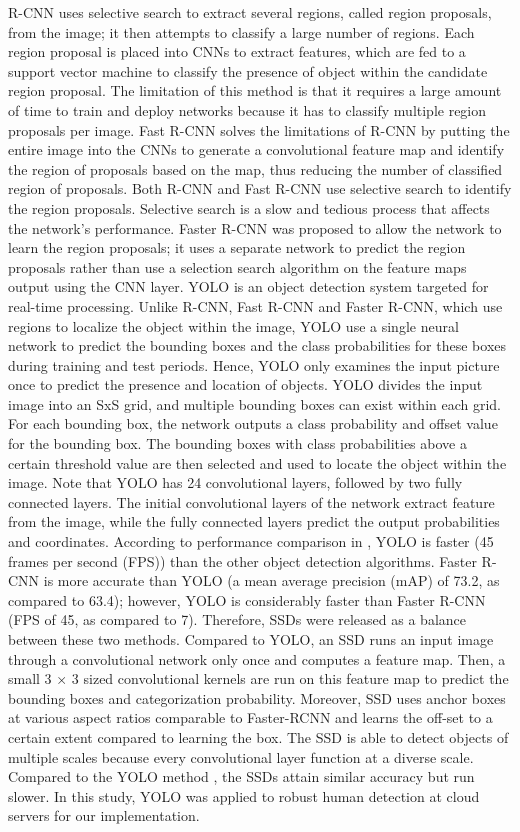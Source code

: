 R-CNN \cite{girshick2014rich} uses selective search \cite{uijlings2013selective} to extract several regions, called region proposals, from the image; it then attempts to classify a large number of regions. Each region proposal is placed into CNNs to extract features, which are fed to a support vector machine to classify the presence of object within the candidate region proposal. The limitation of this method is that it requires a large amount of time to train and deploy networks because it has to classify multiple region proposals per image. Fast R-CNN \cite{girshick2015fast} solves the limitations of R-CNN by putting the entire image into the CNNs to generate a convolutional feature map and identify the region of proposals based on the map, thus reducing the number of classified region of proposals. Both R-CNN and Fast R-CNN use selective search to identify the region proposals. Selective search is a slow and tedious process that affects the network’s performance. Faster R-CNN \cite{ren2015faster} was proposed to allow the network to learn the region proposals; it uses a separate network to predict the region proposals rather than use a selection search algorithm on the feature maps output using the CNN layer. YOLO \cite{redmon2016you} is an object detection system targeted for real-time processing. Unlike R-CNN, Fast R-CNN and Faster R-CNN, which use regions to localize the object within the image, YOLO use a single neural network to predict the bounding boxes and the class probabilities for these boxes during training and test periods. Hence, YOLO only examines the input picture once to predict the presence and location of objects. YOLO divides the input image into an SxS grid, and multiple bounding boxes can exist within each grid. For each bounding box, the network outputs a class probability and offset value for the bounding box. The bounding boxes with class probabilities above a certain threshold value are then selected and used to locate the object within the image. Note that YOLO has 24 convolutional layers, followed by two fully connected layers. The initial convolutional layers of the network extract feature from the image, while the fully connected layers predict the output probabilities and coordinates. According to performance comparison in \cite{redmon2018yolov3}, YOLO is faster (45 frames per second (FPS)) than the other object detection algorithms. Faster R-CNN is more accurate than YOLO (a mean average precision (mAP) of 73.2, as compared to 63.4); however, YOLO is considerably faster than Faster R-CNN (FPS of 45, as compared to 7). Therefore, SSDs  \cite{liu2016ssd} were released as a balance between these two methods. Compared to YOLO, an SSD runs an input image through a convolutional network only once and computes a feature map. Then, a small 3 × 3 sized convolutional kernels are run on this feature map to predict the bounding boxes and categorization probability. Moreover, SSD uses anchor boxes at various aspect ratios comparable to Faster-RCNN and learns the off-set to a certain extent compared to learning the box. The SSD is able to detect objects of multiple scales because every convolutional layer function at a diverse scale. Compared to the YOLO method \cite{redmon2018yolov3}, the SSDs attain similar accuracy but run slower. In this study, YOLO was applied to robust human detection at cloud servers for our implementation. 